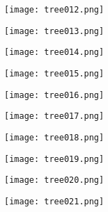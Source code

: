\begin{frame}
\begin{figure}
    \texttt{[image: tree012.png]}
\end{figure}
\end{frame}
\begin{frame}
\begin{figure}
    \texttt{[image: tree013.png]}
\end{figure}
\end{frame}
\begin{frame}
\begin{figure}
    \texttt{[image: tree014.png]}
\end{figure}
\end{frame}
\begin{frame}
\begin{figure}
    \texttt{[image: tree015.png]}
\end{figure}
\end{frame}
\begin{frame}
\begin{figure}
    \texttt{[image: tree016.png]}
\end{figure}
\end{frame}
\begin{frame}
\begin{figure}
    \texttt{[image: tree017.png]}
\end{figure}
\end{frame}
\begin{frame}
\begin{figure}
    \texttt{[image: tree018.png]}
\end{figure}
\end{frame}
\begin{frame}
\begin{figure}
    \texttt{[image: tree019.png]}
\end{figure}
\end{frame}
\begin{frame}
\begin{figure}
    \texttt{[image: tree020.png]}
\end{figure}
\end{frame}
\begin{frame}
\begin{figure}
    \texttt{[image: tree021.png]}
\end{figure}
\end{frame}
